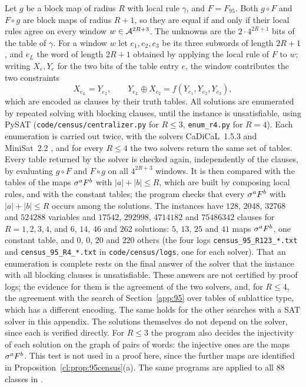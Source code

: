 Let $g$ be a block map of radius $R$ with local rule $\gamma$, and $F=F_{95}$. Both $g\circ F$ and $F\circ g$ are block maps of radius $R+1$, so they are equal if and only if their local rules agree on every window $w\in\mathcal{A}^{2R+3}$. The unknowns are the $2\cdot4^{2R+1}$ bits of the table of $\gamma$. For a window $w$ let $e_1,e_2,e_3$ be its three subwords of length $2R+1$, and $e_L$ the word of length $2R+1$ obtained by applying the local rule of $F$ to $w$; writing $X_e,Y_e$ for the two bits of the table entry $e$, the window contributes the two constraints
\[
X_{e_L}=Y_{e_2},\qquad Y_{e_L}\oplus X_{e_2}=f(Y_{e_1},Y_{e_2},Y_{e_3}),
\]
which are encoded as clauses by their truth tables. All solutions are enumerated by repeated solving with blocking clauses, until the instance is unsatisfiable, using PySAT \cite{PySAT} (\texttt{code/census/centralizer.py} for $R\le3$, \texttt{enum\_r4.py} for $R=4$). Each enumeration is carried out twice, with the solvers CaDiCaL~1.5.3 \cite{CaDiCaL} and MiniSat~2.2 \cite{MiniSat}, and for every $R\le4$ the two solvers return the same set of tables. Every table returned by the solver is checked again, independently of the clauses, by evaluating $g\circ F$ and $F\circ g$ on all $4^{2R+3}$ windows. It is then compared with the tables of the maps $\sigma^aF^b$ with $|a|+|b|\le R$, which are built by composing local rules, and with the constant tables; the program checks that every $\sigma^aF^b$ with $|a|+|b|\le R$ occurs among the solutions. The instances have $128$, $2048$, $32768$ and $524288$ variables and $17542$, $292998$, $4714182$ and $75486342$ clauses for $R=1,2,3,4$, and $6$, $14$, $46$ and $262$ solutions: $5$, $13$, $25$ and $41$ maps $\sigma^aF^b$, one constant table, and $0$, $0$, $20$ and $220$ others (the four logs \texttt{census\_95\_R123\_*.txt} and \texttt{census\_95\_R4\_*.txt} in \texttt{code/census/logs}, one for each solver). That an enumeration is complete rests on the final answer of the solver that the instance with all blocking clauses is unsatisfiable. These answers are not certified by proof logs; the evidence for them is the agreement of the two solvers, and, for $R\le4$, the agreement with the search of Section~\ref{app:95} over tables of sublattice type, which has a different encoding. The same holds for the other searches with a SAT solver in this appendix. The solutions themselves do not depend on the solver, since each is verified directly. For $R\le3$ the program also decides the injectivity of each solution on the graph of pairs of words: the injective ones are the maps $\sigma^aF^b$. This test is not used in a proof here, since the further maps are identified in Proposition~\ref{cl:prop:95census}(a). The same programs are applied to all $88$ classes in \cite{PaperD}.

